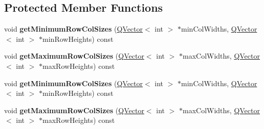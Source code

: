 \subsection*{Protected Member Functions}
\begin{DoxyCompactItemize}
\item 
void {\bfseries get\+Minimum\+Row\+Col\+Sizes} (\hyperlink{class_q_vector}{Q\+Vector}$<$ int $>$ $\ast$min\+Col\+Widths, \hyperlink{class_q_vector}{Q\+Vector}$<$ int $>$ $\ast$min\+Row\+Heights) const \hypertarget{class_q_c_p_layout_grid_ac645fb9b1c4257b08a9f09dee10b9b3f}{}\label{class_q_c_p_layout_grid_ac645fb9b1c4257b08a9f09dee10b9b3f}

\item 
void {\bfseries get\+Maximum\+Row\+Col\+Sizes} (\hyperlink{class_q_vector}{Q\+Vector}$<$ int $>$ $\ast$max\+Col\+Widths, \hyperlink{class_q_vector}{Q\+Vector}$<$ int $>$ $\ast$max\+Row\+Heights) const \hypertarget{class_q_c_p_layout_grid_af348d903e3b8bc416f1fe1b8125d1173}{}\label{class_q_c_p_layout_grid_af348d903e3b8bc416f1fe1b8125d1173}

\item 
void {\bfseries get\+Minimum\+Row\+Col\+Sizes} (\hyperlink{class_q_vector}{Q\+Vector}$<$ int $>$ $\ast$min\+Col\+Widths, \hyperlink{class_q_vector}{Q\+Vector}$<$ int $>$ $\ast$min\+Row\+Heights) const \hypertarget{class_q_c_p_layout_grid_ac645fb9b1c4257b08a9f09dee10b9b3f}{}\label{class_q_c_p_layout_grid_ac645fb9b1c4257b08a9f09dee10b9b3f}

\item 
void {\bfseries get\+Maximum\+Row\+Col\+Sizes} (\hyperlink{class_q_vector}{Q\+Vector}$<$ int $>$ $\ast$max\+Col\+Widths, \hyperlink{class_q_vector}{Q\+Vector}$<$ int $>$ $\ast$max\+Row\+Heights) const \hypertarget{class_q_c_p_layout_grid_af348d903e3b8bc416f1fe1b8125d1173}{}\label{class_q_c_p_layout_grid_af348d903e3b8bc416f1fe1b8125d1173}

\end{DoxyCompactItemize}
